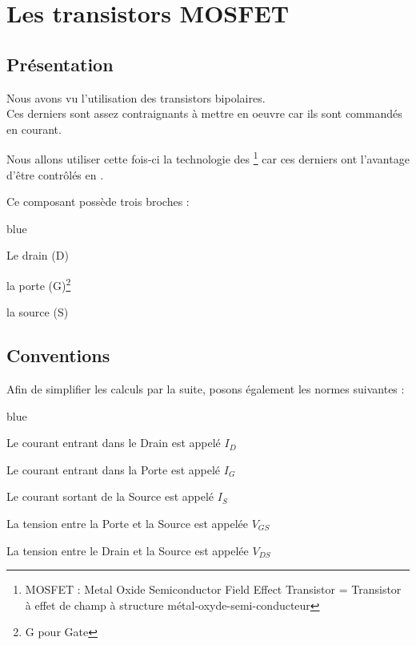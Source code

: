 
\chapter{Les transistors MOSFET}
\section{Présentation}

     Nous avons vu l'utilisation des transistors bipolaires. \\
     Ces derniers sont assez contraignants à mettre en oeuvre car ils sont commandés en courant.

     Nous allons utiliser cette fois-ci la technologie des  \footnote{MOSFET : Metal Oxide Semiconductor Field Effect Transistor = Transistor à effet de champ à structure métal-oxyde-semi-conducteur} car ces derniers ont l'avantage d'être contrôlés en .

     Ce composant possède trois broches : 
     
     \begin{items}{blue}{\Triangle}
     
       \item Le drain (D)
       \item la porte (G)\footnote{G pour Gate}
       \item la source (S)
     
     \end{items}
     
     
     \section{Conventions}
     
     Afin de simplifier les calculs par la suite, posons également les normes suivantes : 
     
     \begin{items}{blue}{\Triangle}
     
       \item Le courant entrant dans le Drain est appelé $I_{D}$
       \item Le courant entrant dans la Porte est appelé $I_{G}$
       \item Le courant sortant de la Source est appelé $I_{S}$

       \item La tension entre la Porte et la Source est appelée $V_{GS}$
       \item La tension entre le Drain et la Source est appelée $V_{DS}$
     \end{items}
     
